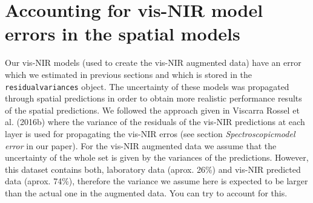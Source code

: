 \documentclass[]{book}
\begin{document}
\hypertarget{accounting-for-vis-nir-model-errors-in-the-spatial-models}{%
\section{Accounting for vis-NIR model errors in the spatial models}\label{accounting-for-vis-nir-model-errors-in-the-spatial-models}}

Our vis-NIR models (used to create the vis-NIR augmented data) have an error which we estimated in previous sections and which is stored in the \texttt{residualvariances} object. The uncertainty of these models was propagated through spatial predictions in order to obtain more realistic performance results of the spatial predictions. We followed the approach given in Viscarra Rossel et al. (2016b) where the variance of the residuals of the vis-NIR predictions at each layer is used for propagating the vis-NIR erros (see section \emph{Spectroscopicmodel error} in our paper).
For the vis-NIR augmented data we assume that the uncertainty of the whole set is given by the variances of the predictions. However, this dataset contains both, laboratory data (aprox. 26\%) and vis-NIR predicted data (aprox. 74\%), therefore the variance we assume here is expected to be larger than the actual one in the augmented data. You can try to account for this.
\end{document}
